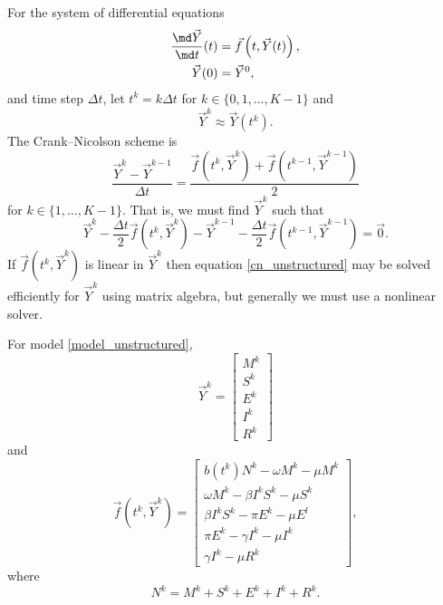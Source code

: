 \documentclass{jpmarticle}
\begin{document}
For the system of differential equations
\begin{equation}
  \begin{split}
    \frac{\md \vec{Y}}{\md t}(t)
    &= \vec{f}\left(t, \vec{Y}(t)\right),
    \\
    \vec{Y}(0) &= \vec{Y}^0,
  \end{split}
\end{equation}
and time step $\Delta t$, let $t^k = k \Delta t$ for
$k \in \{0, 1, \ldots, K - 1\}$ and
\begin{equation}
  \vec{Y}^k \approx \vec{Y}(t^k).
\end{equation}
The Crank--Nicolson scheme is
\begin{equation}
  \frac{\vec{Y}^k - \vec{Y}^{k - 1}}{\Delta t}
  = \frac{
    \vec{f}\left(t^k, \vec{Y}^k\right)
    + \vec{f}\left(t^{k - 1}, \vec{Y}^{k - 1}\right)
  }{2}
\end{equation}
for $k \in \{1, \ldots, K - 1\}$.
That is, we must find $\vec{Y}^k$ such that
\begin{equation}
  \label{cn_unstructured}
  \vec{Y}^k
  - \frac{\Delta t}{2}
  \vec{f}\left(t^k, \vec{Y}^k\right)
  - \vec{Y}^{k - 1}
  - \frac{\Delta t}{2}
  \vec{f}\left(t^{k - 1}, \vec{Y}^{k - 1}\right)
  = \vec{0}.
\end{equation}
If $\vec{f}\left(t^k, \vec{Y}^k\right)$ is linear in $\vec{Y}^k$
then equation \eqref{cn_unstructured} may be solved efficiently for
$\vec{Y}^k$ using matrix algebra, but generally we must use a
nonlinear solver.

For model \eqref{model_unstructured},
\begin{equation}
  \vec{Y}^k =
  \begin{bmatrix}
    M^k \\ S^k \\ E^k \\ I^k \\ R^k
  \end{bmatrix}
\end{equation}
and
\begin{equation}
  \vec{f}\left(t^k, \vec{Y}^k\right) =
  \begin{bmatrix}
    b\left(t^k\right) N^k
    - \omega M^k
    - \mu M^k
    \\
    \omega M^k
    - \beta I^k S^k
    - \mu S^k
    \\
    \beta I^k S^k
    - \pi E^k
    - \mu E^l
    \\
    \pi E^k
    - \gamma I^k
    - \mu I^k
    \\
    \gamma I^k
    - \mu R^k
  \end{bmatrix},
\end{equation}
where
\begin{equation}
  \label{eq:1}
  N^k = M^k + S^k + E^k + I^k + R^k.
\end{equation}
\end{document}
